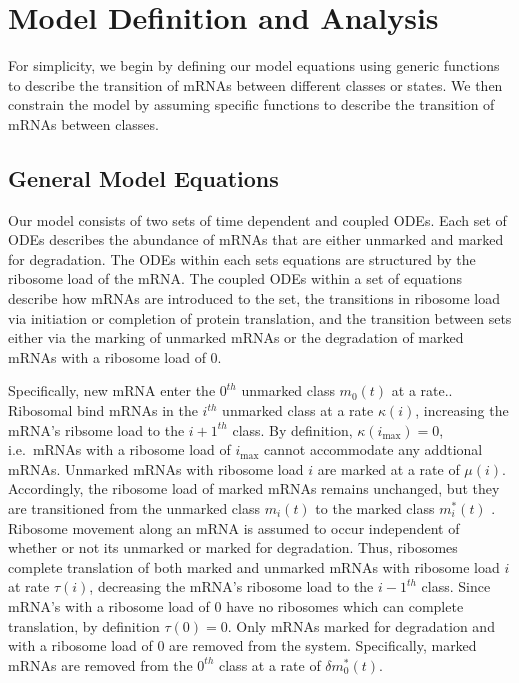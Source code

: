 \documentclass[review]{elsarticle}
\newcommand{\imax}{\ensuremath{i_{\max}}\xspace}
\begin{document}
\section{Model Definition and Analysis}
For simplicity, we begin by defining our model equations using generic functions to describe the transition of mRNAs between different classes or states.
We then constrain the model by assuming specific functions to describe the transition of mRNAs between classes.

\subsection*{General Model Equations}
Our model consists of two sets of time dependent and coupled ODEs.
Each set of ODEs describes the abundance of mRNAs that are either unmarked and marked for degradation.
The ODEs within each sets equations are structured by the ribosome load of the mRNA.
The coupled ODEs within a set of equations describe how mRNAs are introduced to the set, the transitions in ribosome load via initiation or completion of protein translation,  and the transition between sets either via the marking of unmarked mRNAs or the degradation of marked mRNAs with a ribosome load of 0.

Specifically, new mRNA enter the $0^{th}$ unmarked class $m_0(t)$ at a rate..
Ribosomal bind mRNAs in the $i^{th}$ unmarked class at a rate $\kappa(i)$, increasing the mRNA's ribsome load to the $i+1^{th}$ class.
By definition, $\kappa(\imax)= 0$, i.e.~mRNAs with a ribosome load of \imax cannot accommodate any addtional mRNAs.
Unmarked mRNAs with ribosome load $i$ are marked at a rate of $\mu(i)$.
Accordingly, the ribosome load of marked mRNAs remains unchanged, but they are transitioned from the unmarked class $m_i(t)$ to the marked class $m_i^*(t)$ .
Ribosome movement along an mRNA is assumed to occur independent of whether or not its unmarked or marked for degradation.
Thus, ribosomes complete translation of both marked and unmarked mRNAs with ribosome load $i$ at rate $\tau(i)$, decreasing the mRNA's ribosome load to the $i-1^{th}$ class. %
Since mRNA's with a ribosome load of 0 have no ribosomes which can complete translation, by definition $\tau(0) = 0$.
Only mRNAs marked for degradation and with a ribosome load of 0 are removed from the system.
Specifically, marked mRNAs are removed from the $0^{th}$ class at a rate of $\delta m^*_0(t)$.
\end{document}
